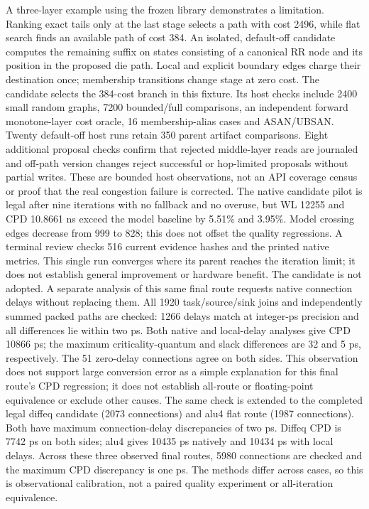\documentclass[10pt]{article}
\begin{document}
A three-layer example using the frozen library demonstrates a limitation.
Ranking exact tails only at the last stage selects a path with cost 2496,
while flat search finds an available path of cost 384. An isolated,
default-off candidate computes the remaining suffix on states consisting
of a canonical RR node and its position in the proposed die path. Local
and explicit boundary edges charge their destination once; membership
transitions change stage at zero cost. The candidate selects the 384-cost
branch in this fixture. Its host checks include 2400 small random graphs,
7200 bounded/full comparisons, an independent forward monotone-layer
cost oracle, 16 membership-alias cases and ASAN/UBSAN. Twenty default-off
host runs retain 350 parent artifact comparisons. Eight additional
proposal checks confirm that rejected middle-layer reads are journaled
and off-path version changes reject successful or hop-limited proposals
without partial writes. These are bounded host observations, not an API
coverage census or proof that the real congestion failure is corrected.
The native candidate pilot is legal after nine iterations with no fallback
and no overuse, but WL 12255 and CPD 10.8661 ns exceed the model baseline
by 5.51\% and 3.95\%. Model crossing edges decrease from 999 to 828; this
does not offset the quality regressions. A terminal review checks 516
current evidence hashes and the printed native metrics. This single run
converges where its parent reaches the iteration limit; it does not
establish general improvement or hardware benefit. The candidate is not
adopted. A separate analysis of this same final route requests native
connection delays without replacing them. All 1920 task/source/sink joins
and independently summed packed paths are checked: 1266 delays match at
integer-ps precision and all differences lie within two ps. Both native
and local-delay analyses give CPD 10866 ps; the maximum criticality-quantum
and slack differences are 32 and 5 ps, respectively. The 51 zero-delay
connections agree on both sides. This observation does not support large
conversion error as a simple explanation for this final route's CPD
regression; it does not establish all-route or floating-point equivalence
or exclude other causes. The same check is extended to the completed
legal diffeq candidate (2073 connections) and alu4 flat route (1987
connections). Both have maximum connection-delay discrepancies of two ps.
Diffeq CPD is 7742 ps on both sides; alu4 gives 10435 ps natively and
10434 ps with local delays. Across these three observed final routes,
5980 connections are checked and the maximum CPD discrepancy is one ps.
The methods differ across cases, so this is observational calibration,
not a paired quality experiment or all-iteration equivalence.
\end{document}
